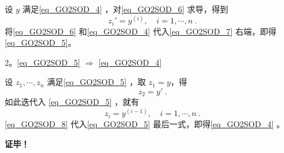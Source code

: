 设 $y$ 满足\autoref{eq_GO2SOD_4} ，对\autoref{eq_GO2SOD_6} 求导，得到
\begin{equation}\label{eq_GO2SOD_7}
z_i'=y^{(i)},\quad i=1,\cdots,n~.
\end{equation}
将\autoref{eq_GO2SOD_6} 和\autoref{eq_GO2SOD_4} 代入\autoref{eq_GO2SOD_7} 右端，即得\autoref{eq_GO2SOD_5}。

2。\autoref{eq_GO2SOD_5} $\Rightarrow$ \autoref{eq_GO2SOD_4} 

设 $z_1,\cdots,z_n$ 满足\autoref{eq_GO2SOD_5} ，取 $z_1=y$，得
\begin{equation}
z_2=y'~.
\end{equation}
如此迭代入 \autoref{eq_GO2SOD_5} ，就有
\begin{equation}\label{eq_GO2SOD_8}
z_i=y^{(i-1)},\quad i=1,\cdots,n~.
\end{equation}
\autoref{eq_GO2SOD_8} 代入\autoref{eq_GO2SOD_5} 最后一式，即得\autoref{eq_GO2SOD_4} 。

\textbf{证毕！}

